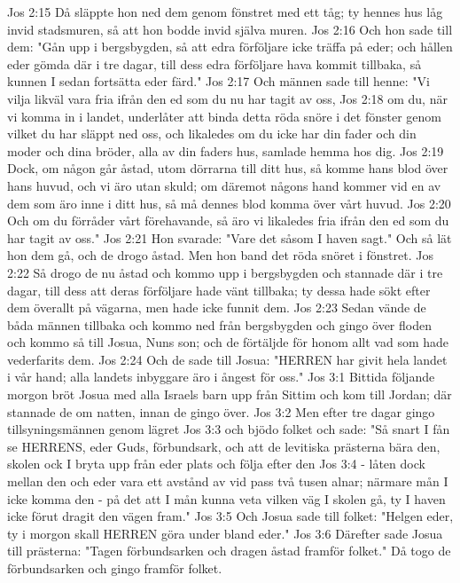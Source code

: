 Jos 2:15  Då släppte hon ned dem genom fönstret med ett tåg; ty hennes hus låg invid stadsmuren, så att hon bodde invid själva muren.
Jos 2:16  Och hon sade till dem: "Gån upp i bergsbygden, så att edra förföljare icke träffa på eder; och hållen eder gömda där i tre dagar, till dess edra förföljare hava kommit tillbaka, så kunnen I sedan fortsätta eder färd."
Jos 2:17  Och männen sade till henne: "Vi vilja likväl vara fria ifrån den ed som du nu har tagit av oss,
Jos 2:18  om du, när vi komma in i landet, underlåter att binda detta röda snöre i det fönster genom vilket du har släppt ned oss, och likaledes om du icke har din fader och din moder och dina bröder, alla av din faders hus, samlade hemma hos dig.
Jos 2:19  Dock, om någon går åstad, utom dörrarna till ditt hus, så komme hans blod över hans huvud, och vi äro utan skuld; om däremot någons hand kommer vid en av dem som äro inne i ditt hus, så må dennes blod komma över vårt huvud.
Jos 2:20  Och om du förråder vårt förehavande, så äro vi likaledes fria ifrån den ed som du har tagit av oss."
Jos 2:21  Hon svarade: "Vare det såsom I haven sagt." Och så lät hon dem gå, och de drogo åstad. Men hon band det röda snöret i fönstret.
Jos 2:22  Så drogo de nu åstad och kommo upp i bergsbygden och stannade där i tre dagar, till dess att deras förföljare hade vänt tillbaka; ty dessa hade sökt efter dem överallt på vägarna, men hade icke funnit dem.
Jos 2:23  Sedan vände de båda männen tillbaka och kommo ned från bergsbygden och gingo över floden och kommo så till Josua, Nuns son; och de förtäljde för honom allt vad som hade vederfarits dem.
Jos 2:24  Och de sade till Josua: "HERREN har givit hela landet i vår hand; alla landets inbyggare äro i ångest för oss."
Jos 3:1  Bittida följande morgon bröt Josua med alla Israels barn upp från Sittim och kom till Jordan; där stannade de om natten, innan de gingo över.
Jos 3:2  Men efter tre dagar gingo tillsyningsmännen genom lägret
Jos 3:3  och bjödo folket och sade: "Så snart I fån se HERRENS, eder Guds, förbundsark, och att de levitiska prästerna bära den, skolen ock I bryta upp från eder plats och följa efter den
Jos 3:4  - låten dock mellan den och eder vara ett avstånd av vid pass två tusen alnar; närmare mån I icke komma den - på det att I mån kunna veta vilken väg I skolen gå, ty I haven icke förut dragit den vägen fram."
Jos 3:5  Och Josua sade till folket: "Helgen eder, ty i morgon skall HERREN göra under bland eder."
Jos 3:6  Därefter sade Josua till prästerna: "Tagen förbundsarken och dragen åstad framför folket." Då togo de förbundsarken och gingo framför folket.
